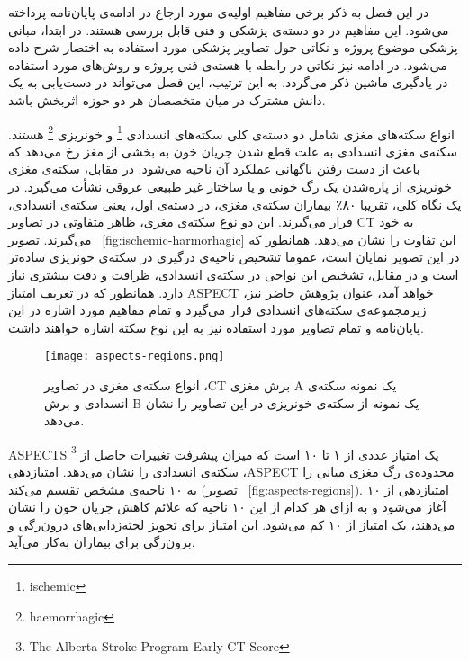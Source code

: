 

در این فصل به ذکر برخی مفاهیم اولیه‌ی مورد ارجاع در ادامه‌ی پایان‌نامه پرداخته می‌شود.
این مفاهیم در دو دسته‌ی پزشکی و فنی قابل بررسی هستند.
در ابتدا، مبانی پزشکی موضوع پروژه و نکاتی حول تصاویر پزشکی مورد استفاده به اختصار شرح داده می‌شود.
در ادامه نیز نکاتی در رابطه با هسته‌ی فنی پروژه و روش‌های مورد استفاده در یادگیری ماشین ذکر می‌گردد.
به این ترتیب، این فصل می‌تواند در دست‌یابی به یک دانش مشترک در میان متخصصان هر دو حوزه اثربخش باشد.



انواع سکته‌های مغزی شامل دو دسته‌ی کلی سکته‌های انسدادی
\footnote{ischemic}
و خونریزی
\footnote{haemorrhagic} 
هستند.
سکته‌ی مغزی انسدادی به علت قطع شدن جریان خون به بخشی از مغز رخ می‌دهد که باعث از دست رفتن ناگهانی عملکرد آن ناحیه می‌شود.
در مقابل، سکته‌ی مغزی خونریزی از پاره‌شدن یک رگ خونی و یا ساختار غیر طبیعی عروقی نشأت می‌گیرد.
در یک نگاه کلی، تقریبا ۸۰٪ بیماران سکته‌ی مغزی، در دسته‌ی اول، یعنی سکته‌ی انسدادی، قرار می‌گیرند.
این دو نوع سکته‌ی مغزی، ظاهر متفاوتی در تصاویر CT به خود می‌گیرند.
تصویر ~\ref{fig:ischemic-harmorhagic} این تفاوت را نشان می‌دهد.
همانطور که در این تصویر نمایان است، عموما تشخیص ناحیه‌ی درگیری
در سکته‌ی خونریزی ساده‌تر است و در مقابل، تشخیص این نواحی در سکته‌ی انسدادی، ظرافت و دقت بیشتری نیاز دارد.
همانطور که در تعریف امتیاز ASPECT خواهد آمد، عنوان پژوهش حاضر نیز، زیرمجموعه‌ی 
سکته‌های انسدادی قرار می‌گیرد و تمام مفاهیم مورد اشاره در این پایان‌نامه و تمام تصاویر مورد استفاده نیز به این نوع سکته اشاره خواهند داشت.

\begin{figure}[ht]
\centering
\texttt{[image: aspects-regions.png]}
\caption[]{انواع سکته‌ی مغزی در تصاویر ،CT برش مغزی A یک نمونه سکته‌ی انسدادی و برش B یک نمونه از سکته‌ی خونریزی در این تصاویر را نشان می‌دهد.}
\label{fig:ischemic-haemorrhagic}
\end{figure}
        

ASPECTS 
\footnote{The Alberta Stroke Program Early CT Score}
یک امتیاز عددی از ۱ تا ۱۰ است که میزان پیشرفت تغییرات حاصل از سکته‌ی انسدادی را 
نشان می‌دهد.
 امتیاز‌دهی ،ASPECT 
 محدوده‌ی رگ مغزی میانی را به ۱۰ ناحیه‌ی مشخص تقسیم می‌کند (تصویر ~\ref{fig:aspects-regions}).
 امتیازدهی  از ۱۰ آغاز می‌شود و به ازای هر کدام از این ۱۰ ناحیه که علائم کاهش جریان 
 خون را نشان می‌دهند، یک امتیاز از ۱۰ کم می‌شود.
 این امتیاز برای تجویز لخته‌زدایی‌های درون‌رگی و برون‌رگی برای بیماران به‌کار می‌آید.

